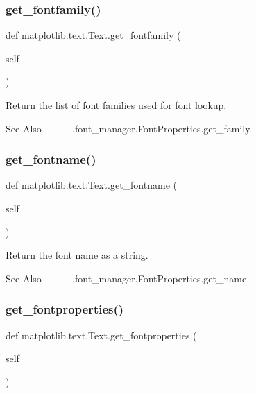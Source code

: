 \subsubsection{\texorpdfstring{get\+\_\+fontfamily()}{get\_fontfamily()}}
{\footnotesize\ttfamily def matplotlib.\+text.\+Text.\+get\+\_\+fontfamily (\begin{DoxyParamCaption}\item[{}]{self }\end{DoxyParamCaption})}

\begin{DoxyVerb}Return the list of font families used for font lookup.

See Also
--------
.font_manager.FontProperties.get_family
\end{DoxyVerb}
 \mbox{\label{classmatplotlib_1_1text_1_1Text_a07685137063bbeba7304d6933963e1a8}} 
\subsubsection{\texorpdfstring{get\+\_\+fontname()}{get\_fontname()}}
{\footnotesize\ttfamily def matplotlib.\+text.\+Text.\+get\+\_\+fontname (\begin{DoxyParamCaption}\item[{}]{self }\end{DoxyParamCaption})}

\begin{DoxyVerb}Return the font name as a string.

See Also
--------
.font_manager.FontProperties.get_name
\end{DoxyVerb}
 \mbox{\label{classmatplotlib_1_1text_1_1Text_abbd7ee4fe49a0a339a16b12e007165e0}} 
\subsubsection{\texorpdfstring{get\+\_\+fontproperties()}{get\_fontproperties()}}
{\footnotesize\ttfamily def matplotlib.\+text.\+Text.\+get\+\_\+fontproperties (\begin{DoxyParamCaption}\item[{}]{self }\end{DoxyParamCaption})}

